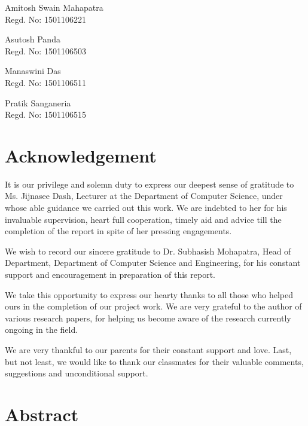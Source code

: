 \documentclass[a4paper,12pt,oneside]{book}
\newcommand{\memberonename}{Amitosh Swain Mahapatra}
\newcommand{\memberoneregdno}{1501106221}
\newcommand{\membertwoname}{Asutosh Panda}
\newcommand{\membertworegdno}{1501106503}
\newcommand{\memberthreename}{Manaswini Das}
\newcommand{\memberthreeregdno}{1501106511}
\newcommand{\memberfourname}{Pratik Sanganeria}
\newcommand{\memberfourregdno}{1501106515}
\begin{document}
\vspace{2cm}
\hfill\begin{varwidth}{\textwidth}
\memberonename\\
Regd. No: \memberoneregdno


\vspace{1.5cm}

\membertwoname\\
Regd. No: \membertworegdno


\vspace{1.5cm}

\memberthreename\\
Regd. No: \memberthreeregdno


\vspace{1.5cm}

\memberfourname\\
Regd. No: \memberfourregdno
\end{varwidth}

\chapter*{\centering Acknowledgement}

It is our privilege and solemn duty to express our deepest sense of gratitude to Ms. Jijnasee Dash, Lecturer at the Department of Computer Science, under whose able guidance we carried out this work. We are indebted to her for his invaluable supervision, heart full cooperation, timely aid and advice till the completion of the report in spite of her pressing engagements.

We wish to record our sincere gratitude to Dr. Subhasish Mohapatra, Head of Department, Department of Computer Science and Engineering, for his constant support and encouragement in preparation of this report.

We take this opportunity to express our hearty thanks to all those who helped ours in the completion of our project work. We are very grateful to the author of various research papers, for helping us become aware of the research currently ongoing in the field.

We are very thankful to our parents for their constant support and love. Last, but not least, we would like to thank our classmates for their valuable comments, suggestions and unconditional support.

\chapter*{Abstract}
\end{document}
